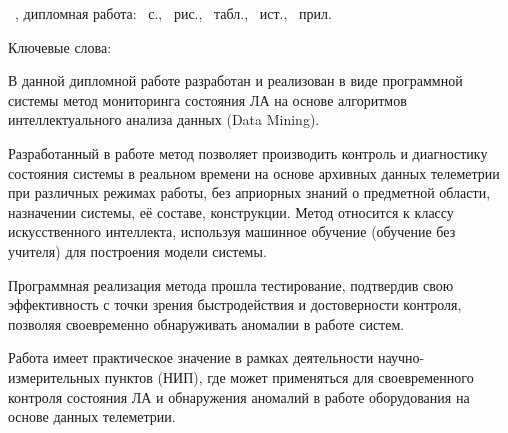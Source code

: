 \protect{}
\sloppy
{
\theauthor\ \MakeUppercase{\thethesistitle}, дипломная работа: \pagestotal~с., \figurestotal~рис., \tablestotal~табл., \bibitemstotal~ист., \appendicestotal~прил.

Ключевые слова: \MakeUppercase{\thekeywords}
}
\medskip

В данной дипломной работе разработан и реализован в виде программной системы метод мониторинга состояния ЛА на основе алгоритмов интеллектуального анализа данных (Data Mining).

Разработанный в работе метод позволяет производить контроль и диагностику состояния системы в реальном времени на основе архивных данных телеметрии при различных режимах работы, без априорных знаний о предметной области, назначении системы, её составе, конструкции. Метод относится к классу искусственного интеллекта, используя машинное обучение (обучение без учителя) для построения модели системы.

Программная реализация метода прошла тестирование, подтвердив свою эффективность с точки зрения быстродействия и достоверности контроля, позволяя своевременно обнаруживать аномалии в работе систем.

Работа имеет практическое значение в рамках деятельности научно-измерительных пунктов (НИП), где может применяться для своевременного контроля состояния ЛА и обнаружения аномалий в работе оборудования на основе данных телеметрии.